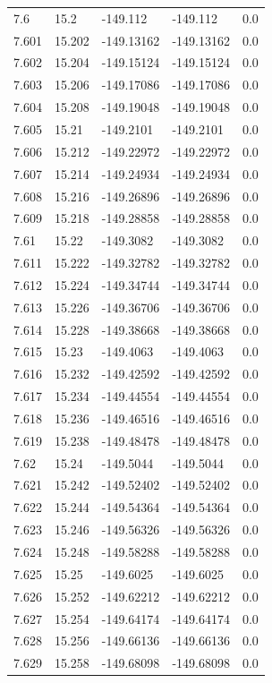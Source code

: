 \begin{tabular}{lllll}
7.6 & 15.2 & -149.112 & -149.112 & 0.0 \\
7.601 & 15.202 & -149.13162 & -149.13162 & 0.0 \\
7.602 & 15.204 & -149.15124 & -149.15124 & 0.0 \\
7.603 & 15.206 & -149.17086 & -149.17086 & 0.0 \\
7.604 & 15.208 & -149.19048 & -149.19048 & 0.0 \\
7.605 & 15.21 & -149.2101 & -149.2101 & 0.0 \\
7.606 & 15.212 & -149.22972 & -149.22972 & 0.0 \\
7.607 & 15.214 & -149.24934 & -149.24934 & 0.0 \\
7.608 & 15.216 & -149.26896 & -149.26896 & 0.0 \\
7.609 & 15.218 & -149.28858 & -149.28858 & 0.0 \\
7.61 & 15.22 & -149.3082 & -149.3082 & 0.0 \\
7.611 & 15.222 & -149.32782 & -149.32782 & 0.0 \\
7.612 & 15.224 & -149.34744 & -149.34744 & 0.0 \\
7.613 & 15.226 & -149.36706 & -149.36706 & 0.0 \\
7.614 & 15.228 & -149.38668 & -149.38668 & 0.0 \\
7.615 & 15.23 & -149.4063 & -149.4063 & 0.0 \\
7.616 & 15.232 & -149.42592 & -149.42592 & 0.0 \\
7.617 & 15.234 & -149.44554 & -149.44554 & 0.0 \\
7.618 & 15.236 & -149.46516 & -149.46516 & 0.0 \\
7.619 & 15.238 & -149.48478 & -149.48478 & 0.0 \\
7.62 & 15.24 & -149.5044 & -149.5044 & 0.0 \\
7.621 & 15.242 & -149.52402 & -149.52402 & 0.0 \\
7.622 & 15.244 & -149.54364 & -149.54364 & 0.0 \\
7.623 & 15.246 & -149.56326 & -149.56326 & 0.0 \\
7.624 & 15.248 & -149.58288 & -149.58288 & 0.0 \\
7.625 & 15.25 & -149.6025 & -149.6025 & 0.0 \\
7.626 & 15.252 & -149.62212 & -149.62212 & 0.0 \\
7.627 & 15.254 & -149.64174 & -149.64174 & 0.0 \\
7.628 & 15.256 & -149.66136 & -149.66136 & 0.0 \\
7.629 & 15.258 & -149.68098 & -149.68098 & 0.0 \\

\end{tabular}
